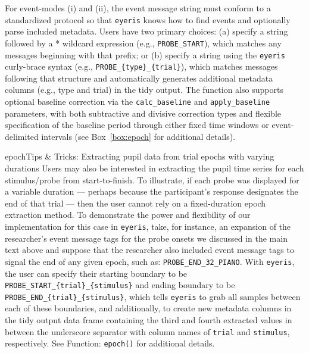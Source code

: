 For event-modes (i) and (ii), the event message string must conform to a standardized protocol so that \texttt{eyeris} knows how to find events and optionally parse included metadata. Users have two primary choices: (a) specify a string followed by a * wildcard expression (e.g., \texttt{PROBE\_START\*}), which matches any messages beginning with that prefix; or (b) specify a string using the \texttt{eyeris} curly-brace syntax (e.g., \texttt{PROBE\_\{type\}\_\{trial\}}), which matches messages following that structure and automatically generates additional metadata columns (e.g., type and trial) in the tidy output. The function also supports optional baseline correction via the \texttt{calc\_baseline} and \texttt{apply\_baseline} parameters, with both subtractive and divisive correction types and flexible specification of the baseline period through either fixed time windows or event-delimited intervals (see Box~\ref{box:epoch} for additional details).

\begin{eyerisbox}{epoch}{Tips \& Tricks: Extracting pupil data from trial epochs with varying durations}
Users may also be interested in extracting the pupil time series for each stimulus/probe from start-to-finish. To illustrate, if each probe was displayed for a variable duration --- perhaps because the participant's response designates the end of that trial --- then the user cannot rely on a fixed-duration epoch extraction method. To demonstrate the power and flexibility of our implementation for this case in \texttt{eyeris}, take, for instance, an expansion of the researcher's event message tags for the probe onsets we discussed in the main text above and suppose that the researcher also included event message tags to signal the end of any given epoch, such as: \texttt{PROBE\_END\_32\_PIANO}. With \texttt{eyeris}, the user can specify their starting boundary to be \texttt{PROBE\_START\_\{trial\}\_\{stimulus\}} and ending boundary to be \texttt{PROBE\_END\_\{trial\}\_\{stimulus\}}, which tells \texttt{eyeris} to grab all samples between each of these boundaries, and additionally, to create new metadata columns in the tidy output data frame containing the third and fourth extracted values in between the underscore separator with column names of \texttt{trial} and \texttt{stimulus}, respectively. See Function: \texttt{epoch()} for additional details.
\end{eyerisbox}

